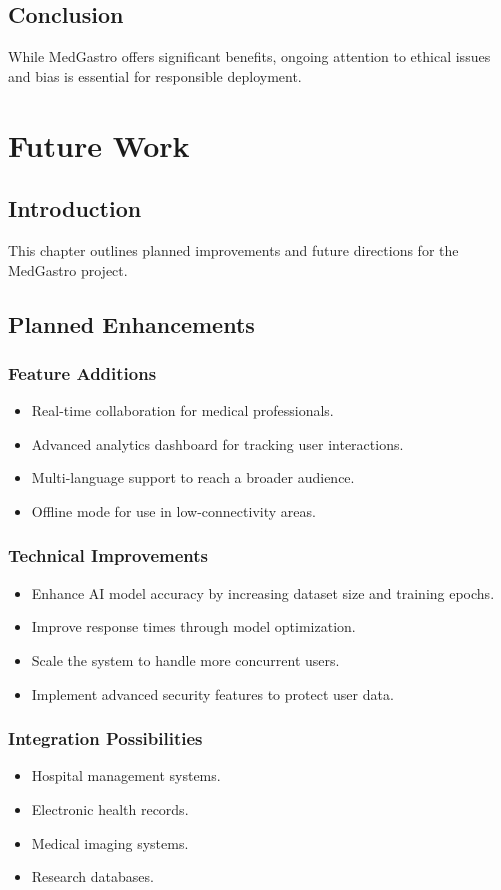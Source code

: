 \documentclass[12pt,a4paper]{report}
\begin{document}
\section{Conclusion}
While MedGastro offers significant benefits, ongoing attention to ethical issues and bias is essential for responsible deployment.

\chapter{Future Work}
\section{Introduction}
This chapter outlines planned improvements and future directions for the MedGastro project.

\section{Planned Enhancements}
\subsection{Feature Additions}
\begin{itemize}
    \item Real-time collaboration for medical professionals.
    \item Advanced analytics dashboard for tracking user interactions.
    \item Multi-language support to reach a broader audience.
    \item Offline mode for use in low-connectivity areas.
\end{itemize}

\subsection{Technical Improvements}
\begin{itemize}
    \item Enhance AI model accuracy by increasing dataset size and training epochs.
    \item Improve response times through model optimization.
    \item Scale the system to handle more concurrent users.
    \item Implement advanced security features to protect user data.
\end{itemize}

\subsection{Integration Possibilities}
\begin{itemize}
    \item Hospital management systems.
    \item Electronic health records.
    \item Medical imaging systems.
    \item Research databases.
\end{itemize}
\end{document}
